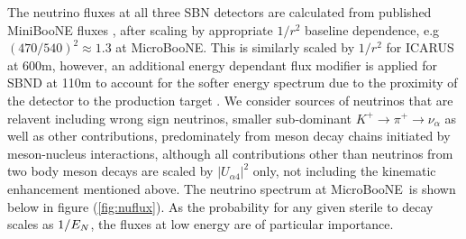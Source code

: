\documentclass[11pt, a4paper]{article}
\def\muboone{MicroBooNE}
\def\ster{\ensuremath N}
\begin{document}
The neutrino fluxes at all three SBN detectors are calculated from published
MiniBooNE fluxes \cite{AguilarArevalo:2008yp}, after scaling by appropriate
$1/r^2$ baseline dependence, e.g $(470/540)^2 \approx 1.3$ at \muboone. This
is similarly scaled by $1/r^2$ for ICARUS at 600m, however, an additional
energy dependant flux modifier is applied for SBND at 110m to account for the
softer energy spectrum due to the proximity of the detector to the production
target \cite{Antonello:2015lea}. We consider sources of neutrinos that are
relavent including wrong sign neutrinos, smaller sub-dominant $K^+\rightarrow
\pi^+\rightarrow \nu_\alpha$ as well as other contributions, predominately from
meson decay chains initiated by meson-nucleus interactions, although all
contributions other than neutrinos from two body meson decays are scaled by
$|U_{\alpha 4}|^2$ only, not including the kinematic enhancement mentioned
above. The neutrino spectrum at \muboone\ is shown below in figure
(\ref{fig:nuflux}). As the probability for any given sterile to decay scales as
$1/E_{\ster}$, the fluxes at low energy are of particular importance. 
\end{document}
